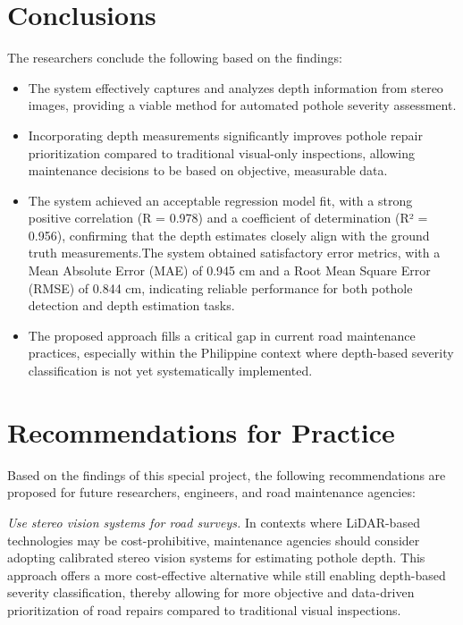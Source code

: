 \section{Conclusions}
The researchers conclude the following based on the findings:

\begin{itemize}
	\item The system effectively captures and analyzes depth information from stereo images, providing a viable method for automated pothole severity assessment.
	
	\item Incorporating depth measurements significantly improves pothole repair prioritization compared to traditional visual-only inspections, allowing maintenance decisions to be based on objective, measurable data.
	\item The system achieved an acceptable regression model fit, with a strong positive correlation (R = 0.978) and a coefficient of determination (R² = 0.956), confirming that the depth estimates closely align with the ground truth measurements.The system obtained satisfactory error metrics, with a Mean Absolute Error (MAE) of 0.945 cm and a Root Mean Square Error (RMSE) of 0.844 cm, indicating reliable performance for both pothole detection and depth estimation tasks.
	\item The proposed approach fills a critical gap in current road maintenance practices, especially within the Philippine context where depth-based severity classification is not yet systematically implemented.
\end{itemize}



\section{Recommendations for Practice}
Based on the findings of this special project, the following recommendations are proposed for future researchers, engineers, and road maintenance agencies:

\textit{Use stereo vision systems for road surveys.} In contexts where LiDAR-based technologies may be cost-prohibitive, maintenance agencies should consider adopting calibrated stereo vision systems for estimating pothole depth. This approach offers a more cost-effective alternative while still enabling depth-based severity classification, thereby allowing for more objective and data-driven prioritization of road repairs compared to traditional visual inspections.

